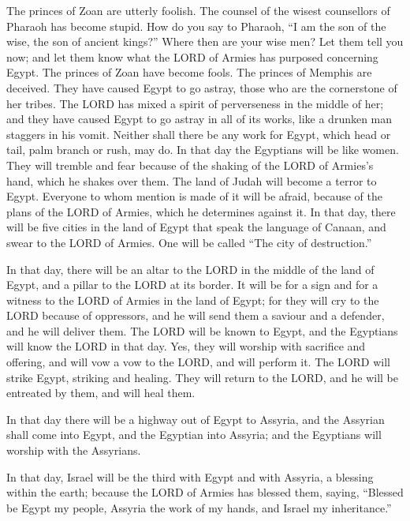  The princes of Zoan are utterly foolish. The counsel of
the wisest counsellors of Pharaoh has become stupid. How do you say to
Pharaoh, ``I am the son of the wise, the son of ancient kings?''
 Where then are your wise men? Let them tell you now; and
let them know what the LORD of Armies has purposed concerning Egypt.
 The princes of Zoan have become fools. The princes of
Memphis are deceived. They have caused Egypt to go astray, those who are
the cornerstone of her tribes.  The LORD has mixed a
spirit of perverseness in the middle of her; and they have caused Egypt
to go astray in all of its works, like a drunken man staggers in his
vomit.  Neither shall there be any work for Egypt, which
head or tail, palm branch or rush, may do.  In that day
the Egyptians will be like women. They will tremble and fear because of
the shaking of the LORD of Armies's hand, which he shakes over them.
 The land of Judah will become a terror to Egypt.
Everyone to whom mention is made of it will be afraid, because of the
plans of the LORD of Armies, which he determines against it.
 In that day, there will be five cities in the land of
Egypt that speak the language of Canaan, and swear to the LORD of
Armies. One will be called ``The city of destruction.''

 In that day, there will be an altar to the LORD in the
middle of the land of Egypt, and a pillar to the LORD at its border.
 It will be for a sign and for a witness to the LORD of
Armies in the land of Egypt; for they will cry to the LORD because of
oppressors, and he will send them a saviour and a defender, and he will
deliver them.  The LORD will be known to Egypt, and the
Egyptians will know the LORD in that day. Yes, they will worship with
sacrifice and offering, and will vow a vow to the LORD, and will perform
it.  The LORD will strike Egypt, striking and healing.
They will return to the LORD, and he will be entreated by them, and will
heal them.

 In that day there will be a highway out of Egypt to
Assyria, and the Assyrian shall come into Egypt, and the Egyptian into
Assyria; and the Egyptians will worship with the Assyrians.

 In that day, Israel will be the third with Egypt and
with Assyria, a blessing within the earth;  because the
LORD of Armies has blessed them, saying, ``Blessed be Egypt my people,
Assyria the work of my hands, and Israel my inheritance.''

